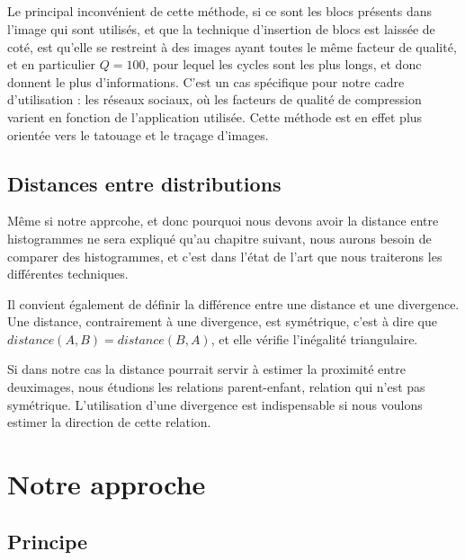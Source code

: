 \documentclass[utf8]{stageM2R} %
\begin{document}
\paragraph{}

Le principal inconvénient de cette méthode, si ce sont les blocs présents dans l'image qui sont utilisés, et que la technique d'insertion de blocs est laissée de coté, est qu'elle se restreint à des images ayant toutes le même facteur de qualité, et en particulier $Q = 100$, pour lequel les cycles sont les plus longs, et donc donnent le plus d'informations. C'est un cas spécifique pour notre cadre d'utilisation : les réseaux sociaux, où les facteurs de qualité de compression varient en fonction de l'application utilisée. Cette méthode est en effet plus orientée vers le tatouage et le traçage d'images.

\section{Distances entre distributions}
\cite{oikawa2015distances}

Même si notre apprcohe, et donc pourquoi nous devons avoir la distance entre histogrammes ne sera expliqué qu'au chapitre suivant, nous aurons besoin de comparer des histogrammes, et c'est dans l'état de l'art que nous traiterons les différentes techniques.

Il convient également de définir la différence entre une distance et une divergence.
Une distance, contrairement à une divergence, est symétrique, c'est à dire que $distance(A,B) = distance(B,A)$, et elle vérifie l'inégalité triangulaire.

Si dans notre cas la distance pourrait servir à estimer la proximité entre deuximages, nous étudions les relations parent-enfant, relation qui n'est pas symétrique. L'utilisation d'une divergence est indispensable si nous voulons estimer la direction de cette relation.

\chapter{Notre approche}
\label{chap3}
\label{chap:notre_approche}
\section{Principe}
\end{document}
